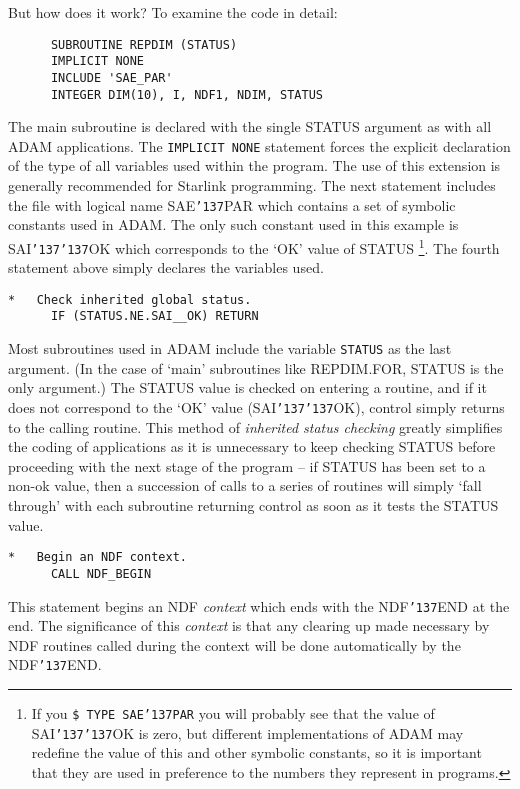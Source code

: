 \documentclass[twoside,11pt]{article}
\renewcommand{\_}{{\tt\char'137}}
\begin{document}
But how does it work?
To examine the code in detail:
\begin{verbatim}
      SUBROUTINE REPDIM (STATUS)                                
      IMPLICIT NONE
      INCLUDE 'SAE_PAR'                                       
      INTEGER DIM(10), I, NDF1, NDIM, STATUS
\end{verbatim}
The  main subroutine is declared with the single STATUS argument
as with all ADAM applications.
The {\tt IMPLICIT NONE} statement forces the explicit declaration of the 
type of all variables used within the program. The use of this extension 
is generally recommended for Starlink programming.
The next statement includes the file with logical name SAE\_PAR which 
contains a set of symbolic constants used in ADAM.
The only such constant used in this example is SAI\_\_OK
which corresponds to  the `OK' value of STATUS
\footnote{If you  {\tt \$ TYPE SAE\_PAR} you will probably 
see that the value of  SAI\_\_OK  is zero, but different implementations 
of ADAM may redefine the value of this and other symbolic  constants, 
so it is important
that they are used in preference to the numbers they represent in programs.}.
The fourth statement above simply declares the variables used. 
\begin{verbatim}
*   Check inherited global status.
      IF (STATUS.NE.SAI__OK) RETURN
\end{verbatim}
Most subroutines used in ADAM include the variable {\tt STATUS} as the last
argument. (In the case of `main' subroutines like REPDIM.FOR, STATUS is the
only argument.)
The STATUS value is checked on entering a routine, and if it does not
correspond to the `OK' value (SAI\_\_OK),  control simply 
returns to the calling routine.
This method of {\sl inherited status checking\/}  greatly simplifies the 
coding of applications as it is unnecessary to keep checking STATUS 
before proceeding with the next stage of the program -- 
if STATUS has been set to a non-ok value, then  a 
succession of calls to a series of routines will simply `fall through'
with each subroutine returning control as soon as it tests the STATUS 
value.
\begin{verbatim}
*   Begin an NDF context.    
      CALL NDF_BEGIN                                          
\end{verbatim}
This statement begins an NDF {\sl context\/} which ends with the 
NDF\_END at the end.
The significance of this {\sl context\/} is that any
clearing up made necessary by NDF routines called
during the context will be done automatically by the NDF\_END.
\end{document}
